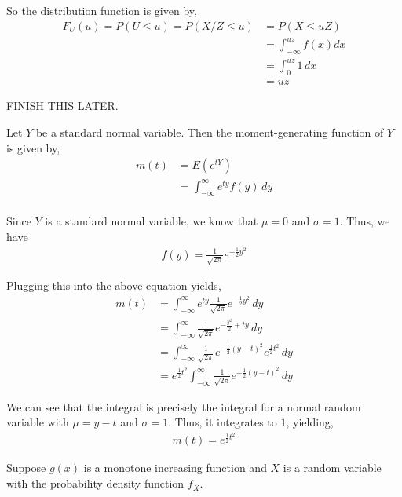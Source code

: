 \documentclass[12pt]{article}
\newenvironment{problem}[2][Problem]{\begin{trivlist}
\item[\hskip \labelsep {\bfseries #1}\hskip \labelsep {\bfseries #2.}]}{\end{trivlist}}
\begin{document}
So the distribution function is given by,
\begin{align*}
F_U(u) = P(U \leq u) = P(X/Z \leq u) &= P(X \leq uZ)\\
&= \int_{-\infty}^{uz} f(x)dx \\
&= \int_0^{uz} 1 \, dx\\
&= uz
\end{align*}

FINISH THIS LATER.

\begin{problem}{3}
\end{problem}

Let $Y$ be a standard normal variable. Then the moment-generating function of $Y$ is given by,
\begin{align*}
m(t) &= E(e^{tY})\\
&= \int_{-\infty}^{\infty} e^{ty}f(y) \, dy\\
\end{align*}

Since $Y$ is a standard normal variable, we know that $\mu = 0$ and $\sigma = 1$. Thus, we have 
\begin{align*}
f(y) = \frac{1}{\sqrt{2\pi}} e^{-\frac{1}{2}y^2}
\end{align*}

Plugging this into the above equation yields,
\begin{align*}
m(t) &= \int_{-\infty}^{\infty} e^{ty} \frac{1}{\sqrt{2\pi}} e^{-\frac{1}{2}y^2} \, dy\\
&= \int_{-\infty}^{\infty} \frac{1}{\sqrt{2\pi}} e^{-\frac{y^2}{2} + ty} \, dy\\
&= \int_{-\infty}^{\infty} \frac{1}{\sqrt{2\pi}} e^{-\frac{1}{2}(y - t)^2} e^{\frac{1}{2} t^2} \, dy\\
&= e^{\frac{1}{2} t^2} \int_{-\infty}^{\infty} \frac{1}{\sqrt{2\pi}} e^{-\frac{1}{2}(y - t)^2} \, dy
\end{align*}

We can see that the integral is precisely the integral for a normal random variable with $\mu = y - t$ and $\sigma = 1$. Thus, it integrates to $1$, yielding,
\begin{align*}
m(t) = e^{\frac{1}{2} t^2}
\end{align*}

\begin{problem}{4}
\end{problem}

Suppose $g(x)$ is a monotone increasing function and $X$ is a random variable with the probability density function $f_X$.\\
\end{document}
